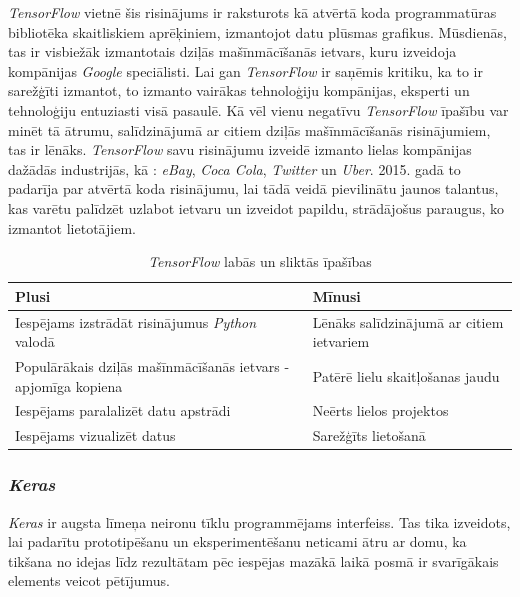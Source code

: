 \textit{TensorFlow} vietnē \cite{tensor1} šis risinājums ir raksturots kā atvērtā koda programmatūras bibliotēka skaitliskiem aprēķiniem, izmantojot datu plūsmas grafikus. Mūsdienās, tas ir visbiežāk izmantotais dziļās mašīnmācīšanās ietvars, kuru izveidoja kompānijas \textit{Google} speciālisti. Lai gan \textit{TensorFlow} ir saņēmis kritiku, ka to ir sarežģīti izmantot, to izmanto vairākas tehnoloģiju kompānijas, eksperti un tehnoloģiju entuziasti visā pasaulē. Kā vēl vienu negatīvu \textit{TensorFlow} īpašību var minēt tā ātrumu, salīdzinājumā ar citiem dziļās mašīnmācīšanās risinājumiem, tas ir \cite{tensor2} lēnāks. \textit{TensorFlow} savu risinājumu izveidē izmanto lielas kompānijas dažādās industrijās, kā : \textit{eBay}, \textit{Coca Cola}, \textit{Twitter} un \textit{Uber}. 2015. gadā to padarīja par atvērtā koda risinājumu, lai tādā veidā pievilinātu jaunos talantus, kas varētu palīdzēt uzlabot ietvaru un izveidot papildu, strādājošus paraugus, ko izmantot lietotājiem. 


	\begin{table}[ht!]	
	\centering
	\begin{tabular}{ |p{7cm}|p{7cm}| }
		\hline
		\textbf{Plusi} & \textbf{Mīnusi}\\ \hline
		Iespējams izstrādāt risinājumus \textit{Python} valodā & Lēnāks salīdzinājumā ar citiem ietvariem \\ \hline 
		Populārākais dziļās mašīnmācīšanās ietvars - apjomīga kopiena & Patērē lielu skaitļošanas jaudu \\ \hline
		Iespējams paralalizēt datu apstrādi  & Neērts lielos projektos \\  \hline
		Iespējams vizualizēt datus & Sarežģīts lietošanā\\ \hline
	\end{tabular}
\caption{\textit{TensorFlow} labās un sliktās īpašības}
\end{table}


\subsubsection{\textit{Keras}}

\textit{Keras} ir augsta līmeņa neironu tīklu programmējams interfeiss. Tas tika izveidots, lai padarītu prototipēšanu un eksperimentēšanu neticami ātru ar domu, ka tikšana no idejas līdz rezultātam pēc iespējas mazākā laikā posmā ir svarīgākais elements veicot pētījumus.

